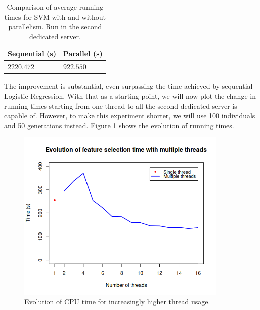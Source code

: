 		\begin{table}[!h]

	        \centering
	        \setlength\arrayrulewidth{0.8pt}

	        \begin{tabular}{| >{\centering\arraybackslash}m{1in} | >{\centering\arraybackslash}m{1in} |}

	            \hline
	            \rowcolor{RoyalBlue}
	            \textbf{Sequential (s)} & \textbf{Parallel (s)} \\
	            \hline
	            $2220.472$ & $922.550$ \\
	            \hline

	        \end{tabular}

	        \caption[Average running times: sequential SVM and parallel SVM]{Comparison of average running times for \acs{SVM} with and without parallelism. Run in \hyperlink{server:secondserver}{the second dedicated server}.}\label{table:svm_sequential_parallel}

	    \end{table}

\newpage

		The improvement is substantial, even surpassing the time achieved by sequential Logistic Regression. With that as a starting point, we will now plot the change in running times starting from one thread to all the second dedicated server is capable of. However, to make this experiment shorter, we will use 100 individuals and 50 generations instead. Figure \ref{gfx:fs_sequential_parallel} shows the evolution of running times.

		\begin{figure}[bth]

			\myfloatalign
			\includegraphics[width=0.9\textwidth]{gfx/FS_Sequential_Parallel.png}
			\caption[Sequential against parallel feature selection]{Evolution of CPU time for increasingly higher thread usage.}\label{gfx:fs_sequential_parallel}

		\end{figure}

